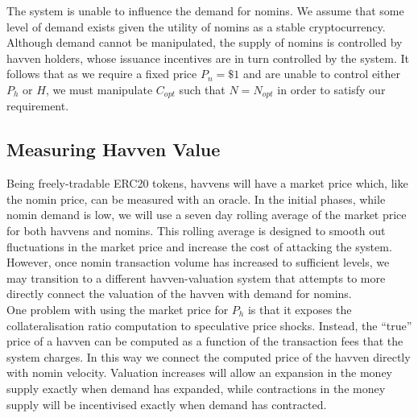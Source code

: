 \begin{center}
\end{center}

\noindent The system is unable to influence the demand for nomins. We assume that some level of demand exists given the utility of nomins as a stable cryptocurrency. Although demand cannot be manipulated, the supply of nomins is controlled by havven holders, whose issuance incentives are in turn controlled by the system. It follows that as we require a fixed price $P_n = \$1 $ and are unable to control either $P_h$ or $H$, we must manipulate $C_{opt}$ such that $N = N_{opt}$ in order to satisfy our requirement.

\subsection{Measuring Havven Value}

\noindent Being freely-tradable ERC20 tokens, havvens will have a market price which, like
the nomin price, can be measured with an oracle. In the initial phases, while nomin demand is low, 
we will use a seven day rolling average of the market price for both havvens and nomins. This rolling
average is designed to smooth out fluctuations in the market price and increase the cost of attacking the
system. However, once nomin transaction volume has increased to sufficient levels, we may transition to a different
havven-valuation system that attempts to more directly connect the valuation of the havven with demand for nomins. \\

\noindent One problem with using the market price for $P_h$ is that it exposes the
collateralisation ratio computation to speculative price shocks.
Instead, the ``true'' price of a havven can be computed as a function of the transaction
fees that the system charges. In this way we connect the computed price of the havven directly with
nomin velocity.
Valuation increases will allow an expansion in the money supply exactly when demand has expanded,
while contractions in the money supply will be incentivised exactly when demand has contracted. \\

